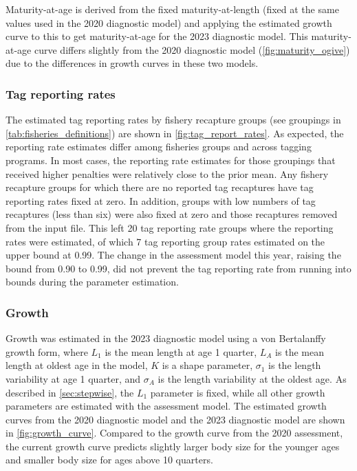 Maturity-at-age is derived from the fixed maturity-at-length (fixed at the same values used in the 2020 diagnostic model) and applying the estimated growth curve to this to get maturity-at-age for the 2023 diagnostic model. This maturity-at-age curve differs slightly from the 2020 diagnostic model (\autoref{fig:maturity_ogive}) due to the differences in growth curves in these two models.

\subsubsection{Tag reporting rates}
\label{sec:tag_reporting_rates}

The estimated tag reporting rates by fishery recapture groups (see groupings in \autoref{tab:fisheries_definitions}) are shown in \autoref{fig:tag_report_rates}. As expected, the reporting rate estimates differ among fisheries groups and across tagging programs. In most cases, the reporting rate estimates for those groupings that received higher penalties were relatively close to the prior mean. Any fishery recapture groups for which there are no reported tag recaptures have tag reporting rates fixed at zero. In addition, groups with low numbers of tag recaptures (less than six) were also fixed at zero and those recaptures removed from the input file. This left 20 tag reporting rate groups where the reporting rates were estimated, of which 7 tag reporting group rates estimated on the upper bound at 0.99. The change in the assessment model this year, raising the bound from 0.90 to 0.99, did not prevent the tag reporting rate from running into bounds during the parameter estimation.

\subsubsection{Growth}
\label{sec:growth_param}

Growth was estimated in the 2023 diagnostic model using a von Bertalanffy growth form, where $L_1$ is the mean length at age 1 quarter, $L_A$ is the mean length at oldest age in the model, $K$ is a shape parameter, $\sigma_1$ is the length variability at age 1 quarter, and $\sigma_A$ is the length variability at the oldest age. As described in \autoref{sec:stepwise}, the $L_1$ parameter is fixed, while all other growth parameters are estimated with the assessment model. The estimated growth curves from the 2020 diagnostic model and the 2023 diagnostic model are shown in \autoref{fig:growth_curve}. Compared to the growth curve from the 2020 assessment, the current growth curve predicts slightly larger body size for the younger ages and smaller body size for ages above 10 quarters.
